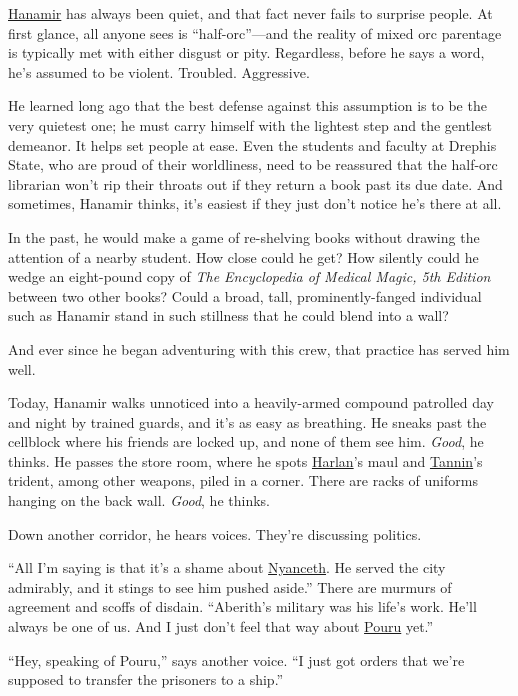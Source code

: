 \documentclass[smalldemyvopaper,11pt,twoside,onecolumn,openright,extrafontsizes]{memoir}
\begin{document}
\href{/characters/hanamir/}{Hanamir} has always been quiet, and that
fact never fails to surprise people. At first glance, all anyone sees is
``half-orc''---and the reality of mixed orc parentage is typically met
with either disgust or pity. Regardless, before he says a word, he's
assumed to be violent. Troubled. Aggressive.

He learned long ago that the best defense against this assumption is to
be the very quietest one; he must carry himself with the lightest step
and the gentlest demeanor. It helps set people at ease. Even the
students and faculty at Drephis State, who are proud of their
worldliness, need to be reassured that the half-orc librarian won't rip
their throats out if they return a book past its due date. And
sometimes, Hanamir thinks, it's easiest if they just don't notice he's
there at all.

In the past, he would make a game of re-shelving books without drawing
the attention of a nearby student. How close could he get? How silently
could he wedge an eight-pound copy of \emph{The Encyclopedia of Medical
Magic, 5th Edition} between two other books? Could a broad, tall,
prominently-fanged individual such as Hanamir stand in such stillness
that he could blend into a wall?

And ever since he began adventuring with this crew, that practice has
served him well.

Today, Hanamir walks unnoticed into a heavily-armed compound patrolled
day and night by trained guards, and it's as easy as breathing. He
sneaks past the cellblock where his friends are locked up, and none of
them see him. \emph{Good}, he thinks. He passes the store room, where he
spots \href{/characters/harlan/}{Harlan}'s maul and
\href{/characters/tannin/}{Tannin}'s trident, among other weapons, piled
in a corner. There are racks of uniforms hanging on the back wall.
\emph{Good}, he thinks.

Down another corridor, he hears voices. They're discussing politics.

``All I'm saying is that it's a shame about
\href{/characters/nyanceth/}{Nyanceth}. He served the city admirably,
and it stings to see him pushed aside.'' There are murmurs of agreement
and scoffs of disdain. ``Aberith's military was his life's work. He'll
always be one of us. And I just don't feel that way about
\href{/characters/pouru/}{Pouru} yet.''

``Hey, speaking of Pouru,'' says another voice. ``I just got orders that
we're supposed to transfer the prisoners to a ship.''
\end{document}
